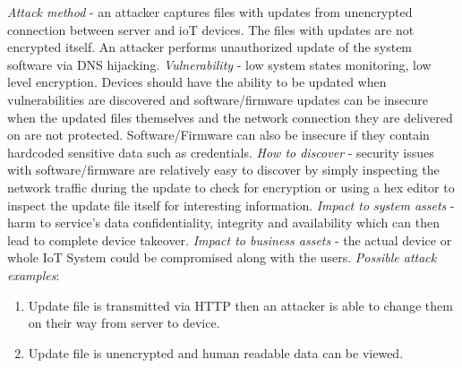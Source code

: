 \documentclass[12pt]{article}
\begin{document}
\begin{enumerate}
		\newline \textit{Attack method} - an attacker captures files with updates from unencrypted connection between server and ioT devices. The files with updates are not encrypted itself. An attacker performs unauthorized update of the system software via DNS hijacking.
		\newline \textit{Vulnerability} - low system states monitoring, low level encryption. Devices should have the ability to be updated when vulnerabilities are discovered and software/firmware updates can be insecure when the updated files themselves and the network connection they are delivered on are not protected. Software/Firmware can also be
		insecure if they contain hardcoded sensitive data such as credentials.
		\newline \textit{How to discover} - security issues with software/firmware are relatively easy to discover by simply inspecting the network traffic during the update to check for encryption or using a hex editor to inspect the update file itself for interesting information.
		\newline \textit{Impact to system assets} - harm to service’s data confidentiality, integrity and availability which can then lead to complete device takeover.
		\newline \textit{Impact to business assets} - the actual device or whole IoT System could be compromised along with the users.
		\newline \textit{Possible attack examples}:
		\begin{enumerate}[label=(\roman*)]
			\item Update file is transmitted via HTTP then an attacker is able to change them on their way from server to device.
			\item Update file is unencrypted and human readable data can be viewed.
			

\end{enumerate}
\end{enumerate}
\end{document}
